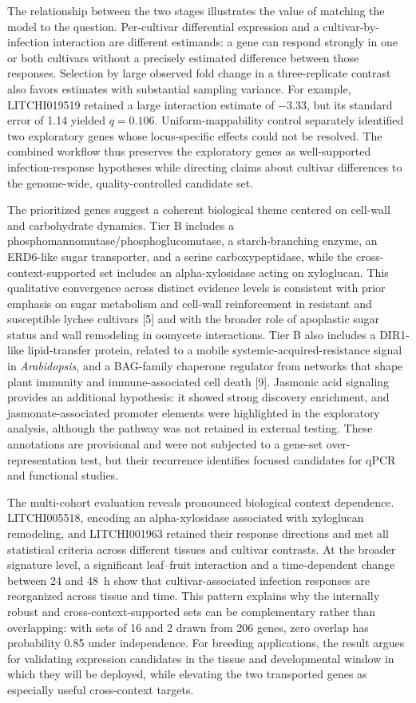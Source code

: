 \documentclass[referee,pdflatex,sn-basic,Numbered]{sn-jnl}
\newcommand{\q}{\textit{q}}
\begin{document}
The relationship between the two stages illustrates the value of matching the model to the question. Per-cultivar differential expression and a cultivar-by-infection interaction are different estimands: a gene can respond strongly in one or both cultivars without a precisely estimated difference between those responses. Selection by large observed fold change in a three-replicate contrast also favors estimates with substantial sampling variance. For example, LITCHI019519 retained a large interaction estimate of $-3.33$, but its standard error of 1.14 yielded $\q=0.106$. Uniform-mappability control separately identified two exploratory genes whose locus-specific effects could not be resolved. The combined workflow thus preserves the exploratory genes as well-supported infection-response hypotheses while directing claims about cultivar differences to the genome-wide, quality-controlled candidate set.

The prioritized genes suggest a coherent biological theme centered on cell-wall and carbohydrate dynamics. Tier B includes a phosphomannomutase/phosphoglucomutase, a starch-branching enzyme, an ERD6-like sugar transporter, and a serine carboxypeptidase, while the cross-context-supported set includes an alpha-xylosidase acting on xyloglucan. This qualitative convergence across distinct evidence levels is consistent with prior emphasis on sugar metabolism and cell-wall reinforcement in resistant and susceptible lychee cultivars [5] and with the broader role of apoplastic sugar status and wall remodeling in oomycete interactions. Tier B also includes a DIR1-like lipid-transfer protein, related to a mobile systemic-acquired-resistance signal in \textit{Arabidopsis}, and a BAG-family chaperone regulator from networks that shape plant immunity and immune-associated cell death [9]. Jasmonic acid signaling provides an additional hypothesis: it showed strong discovery enrichment, and jasmonate-associated promoter elements were highlighted in the exploratory analysis, although the pathway was not retained in external testing. These annotations are provisional and were not subjected to a gene-set over-representation test, but their recurrence identifies focused candidates for qPCR and functional studies.

The multi-cohort evaluation reveals pronounced biological context dependence. LITCHI005518, encoding an alpha-xylosidase associated with xyloglucan remodeling, and LITCHI001963 retained their response directions and met all statistical criteria across different tissues and cultivar contrasts. At the broader signature level, a significant leaf--fruit interaction and a time-dependent change between 24 and 48~h show that cultivar-associated infection responses are reorganized across tissue and time. This pattern explains why the internally robust and cross-context-supported sets can be complementary rather than overlapping: with sets of 16 and 2 drawn from 206 genes, zero overlap has probability 0.85 under independence. For breeding applications, the result argues for validating expression candidates in the tissue and developmental window in which they will be deployed, while elevating the two transported genes as especially useful cross-context targets.
\end{document}
